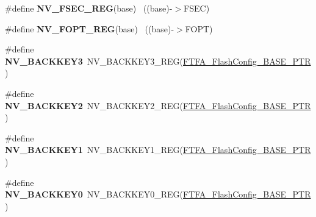 \begin{DoxyCompactItemize}
\item 
\hypertarget{group___n_v___register___accessor___macros_gafcfd540f11abf7f4644b7c5a5bc272fe}{}\#define {\bfseries N\+V\+\_\+\+F\+S\+E\+C\+\_\+\+R\+E\+G}(base)                                            ~((base)-\/$>$F\+S\+E\+C)\label{group___n_v___register___accessor___macros_gafcfd540f11abf7f4644b7c5a5bc272fe}

\item 
\hypertarget{group___n_v___register___accessor___macros_ga66cb061090c7bd7c8b2447b133a93ce5}{}\#define {\bfseries N\+V\+\_\+\+F\+O\+P\+T\+\_\+\+R\+E\+G}(base)                                            ~((base)-\/$>$F\+O\+P\+T)\label{group___n_v___register___accessor___macros_ga66cb061090c7bd7c8b2447b133a93ce5}

\item 
\hypertarget{group___n_v___register___accessor___macros_ga18932af5b184d02998db112b364e45e1}{}\#define {\bfseries N\+V\+\_\+\+B\+A\+C\+K\+K\+E\+Y3}~N\+V\+\_\+\+B\+A\+C\+K\+K\+E\+Y3\+\_\+\+R\+E\+G(\hyperlink{group___n_v___peripheral_ga3458652dfc38239f92682556e63596b5}{F\+T\+F\+A\+\_\+\+Flash\+Config\+\_\+\+B\+A\+S\+E\+\_\+\+P\+T\+R})\label{group___n_v___register___accessor___macros_ga18932af5b184d02998db112b364e45e1}

\item 
\hypertarget{group___n_v___register___accessor___macros_ga51642a3d84acba43ff0aa3925226ab32}{}\#define {\bfseries N\+V\+\_\+\+B\+A\+C\+K\+K\+E\+Y2}~N\+V\+\_\+\+B\+A\+C\+K\+K\+E\+Y2\+\_\+\+R\+E\+G(\hyperlink{group___n_v___peripheral_ga3458652dfc38239f92682556e63596b5}{F\+T\+F\+A\+\_\+\+Flash\+Config\+\_\+\+B\+A\+S\+E\+\_\+\+P\+T\+R})\label{group___n_v___register___accessor___macros_ga51642a3d84acba43ff0aa3925226ab32}

\item 
\hypertarget{group___n_v___register___accessor___macros_gae849f8e6eaa76305b07c567463074dc9}{}\#define {\bfseries N\+V\+\_\+\+B\+A\+C\+K\+K\+E\+Y1}~N\+V\+\_\+\+B\+A\+C\+K\+K\+E\+Y1\+\_\+\+R\+E\+G(\hyperlink{group___n_v___peripheral_ga3458652dfc38239f92682556e63596b5}{F\+T\+F\+A\+\_\+\+Flash\+Config\+\_\+\+B\+A\+S\+E\+\_\+\+P\+T\+R})\label{group___n_v___register___accessor___macros_gae849f8e6eaa76305b07c567463074dc9}

\item 
\hypertarget{group___n_v___register___accessor___macros_gadb8e2eb4db4de2a485b31c2a1dd393af}{}\#define {\bfseries N\+V\+\_\+\+B\+A\+C\+K\+K\+E\+Y0}~N\+V\+\_\+\+B\+A\+C\+K\+K\+E\+Y0\+\_\+\+R\+E\+G(\hyperlink{group___n_v___peripheral_ga3458652dfc38239f92682556e63596b5}{F\+T\+F\+A\+\_\+\+Flash\+Config\+\_\+\+B\+A\+S\+E\+\_\+\+P\+T\+R})\label{group___n_v___register___accessor___macros_gadb8e2eb4db4de2a485b31c2a1dd393af}


\end{DoxyCompactItemize}
